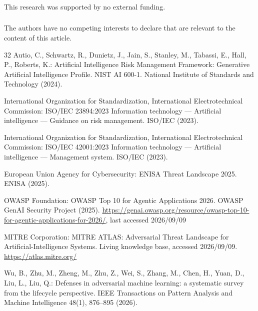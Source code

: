 \documentclass[runningheads]{llncs}
\begin{document}
\begin{credits}
\subsubsection{\ackname} This research was supported by no external funding.

\subsubsection{\discintname}
The authors have no competing interests to declare that are relevant to the content of this article.
\end{credits}

%
\begin{thebibliography}{32}
Autio, C., Schwartz, R., Dunietz, J., Jain, S., Stanley, M., Tabassi, E., Hall, P., Roberts, K.: Artificial Intelligence Risk Management Framework: Generative Artificial Intelligence Profile. NIST AI 600-1. National Institute of Standards and Technology (2024). 

International Organization for Standardization, International Electrotechnical Commission: ISO/IEC 23894:2023 Information technology --- Artificial intelligence --- Guidance on risk management. ISO/IEC (2023).

International Organization for Standardization, International Electrotechnical Commission: ISO/IEC 42001:2023 Information technology --- Artificial intelligence --- Management system. ISO/IEC (2023).

European Union Agency for Cybersecurity: ENISA Threat Landscape 2025. ENISA (2025).

OWASP Foundation: OWASP Top 10 for Agentic Applications 2026. OWASP GenAI Security Project (2025). \url{https://genai.owasp.org/resource/owasp-top-10-for-agentic-applications-for-2026/}, last accessed 2026/09/09

MITRE Corporation: MITRE ATLAS: Adversarial Threat Landscape for Artificial-Intelligence Systems. Living knowledge base, accessed 2026/09/09. \url{https://atlas.mitre.org/}


Wu, B., Zhu, M., Zheng, M., Zhu, Z., Wei, S., Zhang, M., Chen, H., Yuan, D., Liu, L., Liu, Q.: Defenses in adversarial machine learning: a systematic survey from the lifecycle perspective. IEEE Transactions on Pattern Analysis and Machine Intelligence 48(1), 876--895 (2026). 


\end{thebibliography}
\end{document}
